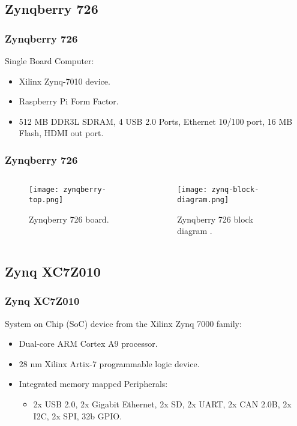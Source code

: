 
\subsection{Zynqberry 726}

\begin{frame}
	\frametitle{Zynqberry 726}
	Single Board Computer:
	\begin{itemize}
		\pause
		\item Xilinx Zynq-7010 device.
		\pause
		\item Raspberry Pi Form Factor.
		\pause
		\item 512 MB DDR3L SDRAM, 4 USB 2.0 Ports, Ethernet 10/100 port, 16 MB Flash, HDMI out port.
	\end{itemize}
\end{frame}

\begin{frame}
	\frametitle{Zynqberry 726}
	\begin{columns}
		\begin{column}{0.4\textwidth}
			\begin{figure}
				\texttt{[image: zynqberry-top.png]}
				\caption{Zynqberry 726 board.}\label{fig:zynqberry-top}
			\end{figure}
		\end{column}
		\pause
		\begin{column}{0.5\textwidth}
			\begin{figure}
				\texttt{[image: zynq-block-diagram.png]}
				\caption{Zynqberry 726 block diagram \cite{zynq-trm}.}\label{fig:zynq-block-diagram}
			\end{figure}
		\end{column}
	\end{columns}
\end{frame}

\subsection{Zynq XC7Z010}

\begin{frame}
	\frametitle{Zynq XC7Z010}
	System on Chip (SoC) device from the Xilinx Zynq 7000 family:
	\begin{itemize}
		\pause
		\item Dual-core ARM Cortex A9 processor.
		\pause
		\item 28 nm Xilinx Artix-7 programmable logic device.
		\pause
		\item Integrated memory mapped Peripherals:
		\begin{itemize}
			\item 2x USB 2.0, 2x Gigabit Ethernet, 2x SD, 2x UART, 2x CAN 2.0B, 2x I2C, 2x SPI, 32b GPIO.
		\end{itemize}
	\end{itemize}
\end{frame}

